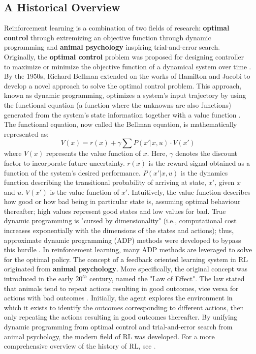 \subsection{A Historical Overview}
Reinforcement learning is a combination of two fields of research: \textbf{optimal control} through extremizing an objective function through dynamic programming and \textbf{animal psychology} inspiring trial-and-error search. Originally, the \textbf{optimal control} problem was proposed for designing controller to maximize or minimize the objective function of a dynamical system over time \cite{mpc}.  By the 1950s, Richard Bellman extended on the works of Hamilton and Jacobi to develop a novel approach to solve the optimal control problem.  This approach, known as dynamic programming, optimizes a system's input trajectory by using the functional equation (a function where the unknowns are also functions) generated from the system's state information together with a value function \cite{bellman1}.  The functional equation, now called the Bellman equation, is mathematically represented as:
\begin{equation}
    V(x) = r(x) + \gamma \sum P(x' | x, u) \cdot V(x')
    \label{eq:bellman_eq}
\end{equation}
where $V(x)$ represents the value function of $x$. Here, $\gamma$ denotes the discount factor to incorporate future uncertainty. $r(x)$ is the reward signal obtained as a function of the system's desired performance. $P(x'|x, u)$ is the dynamics function describing the transitional probability of arriving at state, $x'$, given $x$ and $u$. $V(x')$ is the value function of $x'$. Intuitively, the value function describes how good or how bad being in particular state is, assuming optimal behaviour thereafter; high values represent good states and low values for bad.  True dynamic programming is "cursed by dimensionality" (i.e., computational cost increases exponentially with the dimensions of the states and actions); thus, approximate dynamic programming (ADP) methods were developed to bypass this hurdle \cite{adp}.  In reinforcement learning, many ADP methods are leveraged to solve for the optimal policy. The concept of a feedback oriented learning system in RL originated from \textbf{animal psychology}. More specifically, the original concept was introduced in the early $20^{th}$ century, named the "Law of Effect". The law stated that animals tend to repeat actions resulting in good outcomes, vice versa for actions with bad outcomes \cite{thorndike}. Initially, the agent explores the environment in which it exists to identify the outcomes corresponding to different actions, then only repeating the actions resulting in good outcomes thereafter. By unifying dynamic programming from optimal control and trial-and-error search from animal psychology, the modern field of RL was developed. For a more comprehensive overview of the history of RL, see \cite{sutton}.

